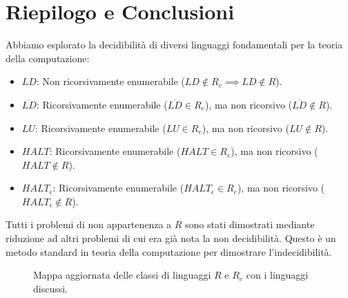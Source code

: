 \documentclass[a4paper, 11pt]{book} %
\theoremstyle{definition}
\begin{document}
\section{Riepilogo e Conclusioni}
Abbiamo esplorato la decidibilità di diversi linguaggi fondamentali per la teoria della computazione:
\begin{itemize}
    \item $LD$: Non ricorsivamente enumerabile ($LD \notin R_e \implies LD \notin R$).
    \item $\overline{LD}$: Ricorsivamente enumerabile ($\overline{LD} \in R_e$), ma non ricorsivo ($\overline{LD} \notin R$).
    \item $LU$: Ricorsivamente enumerabile ($LU \in R_e$), ma non ricorsivo ($LU \notin R$).
    \item $HALT$: Ricorsivamente enumerabile ($HALT \in R_e$), ma non ricorsivo ($HALT \notin R$).
    \item $HALT_\epsilon$: Ricorsivamente enumerabile ($HALT_\epsilon \in R_e$), ma non ricorsivo ($HALT_\epsilon \notin R$).
\end{itemize}
Tutti i problemi di non appartenenza a $R$ sono stati dimostrati mediante riduzione ad altri problemi di cui era già nota la non decidibilità. Questo è un metodo standard in teoria della computazione per dimostrare l'indecidibilità.

\begin{figure}[h!]
    \centering
    \caption{Mappa aggiornata delle classi di linguaggi $R$ e $R_e$ con i linguaggi discussi.}
    \label{fig:r_re_map_updated}
\end{figure}
\end{document}
